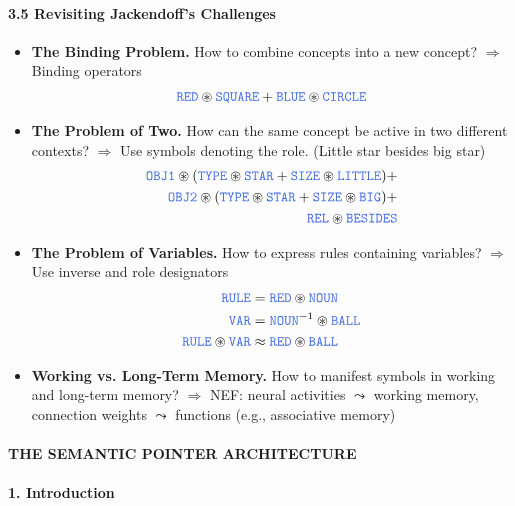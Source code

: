 \documentclass[10pt,letterpaper]{article}
\author{Andreas Stöckel}
\begin{document}
	
\newcommand{\Pred}[1]{\mathbf{\textcolor{Crimson}{#1}}}
\newcommand{\Obj}[1]{\mathtt{\textcolor{RoyalBlue}{#1}}}
\newcommand{\Fun}[1]{\mathit{\textcolor{ForestGreen}{#1}}}
\newcommand{\CC}{\circledast}

\paragraph{3.5 Revisiting Jackendoff's Challenges}
\begin{itemize}
	\item \textbf{The Binding Problem.} How to combine concepts into a new concept? $\Rightarrow$ Binding operators
	\begin{align*}	
		\Obj{RED} \CC \Obj{SQUARE} + \Obj{BLUE} \CC \Obj{CIRCLE}
	\end{align*}
	\item \textbf{The Problem of Two.} How can the same concept be active in two different contexts?
	$\Rightarrow $ Use symbols denoting the role. (Little star besides big star)
	\begin{align*}
		\Obj{OBJ1} \CC (\Obj{TYPE} \CC \Obj{STAR} + \Obj{SIZE} \CC \Obj{LITTLE}) + \\
		\Obj{OBJ2} \CC (\Obj{TYPE} \CC \Obj{STAR} + \Obj{SIZE} \CC \Obj{BIG}) + \\
		\Obj{REL} \CC \Obj{BESIDES}
	\end{align*}
	\item \textbf{The Problem of Variables.} How to express rules containing variables? $\Rightarrow$ Use inverse and role designators
	\begin{align*}
		\Obj{RULE} &= \Obj{RED} \CC \Obj{NOUN} \\
		\Obj{VAR} &= \Obj{NOUN}^{-1} \CC \Obj{BALL} \\
		\Obj{RULE} \CC \Obj{VAR} &\approx \Obj{RED} \CC \Obj{BALL}
	\end{align*}
	\item \textbf{Working vs. Long-Term Memory.}  How to manifest symbols in working and long-term memory?
	$\Rightarrow$ NEF: neural activities $\leadsto$ working memory, connection weights $\leadsto$ functions (e.g., associative memory)
\end{itemize}

\paragraph{THE SEMANTIC POINTER ARCHITECTURE}

\paragraph{1. Introduction}
\end{document}
